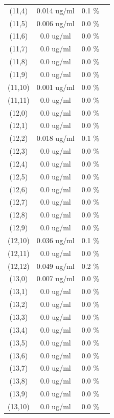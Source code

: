 \documentclass{article}
\begin{document}
\begin{tabular}{c c c c}
(11,4)&        0.014 ug/ml        &0.1 \%\\
(11,5)&        0.006 ug/ml        &0.0 \%\\
(11,6)&        0.0 ug/ml        &0.0 \%\\
(11,7)&        0.0 ug/ml        &0.0 \%\\
(11,8)&        0.0 ug/ml        &0.0 \%\\
(11,9)&        0.0 ug/ml        &0.0 \%\\
(11,10)&        0.001 ug/ml        &0.0 \%\\
(11,11)&        0.0 ug/ml        &0.0 \%\\
(12,0)&        0.0 ug/ml        &0.0 \%\\
(12,1)&        0.0 ug/ml        &0.0 \%\\
(12,2)&        0.018 ug/ml        &0.1 \%\\
(12,3)&        0.0 ug/ml        &0.0 \%\\
(12,4)&        0.0 ug/ml        &0.0 \%\\
(12,5)&        0.0 ug/ml        &0.0 \%\\
(12,6)&        0.0 ug/ml        &0.0 \%\\
(12,7)&        0.0 ug/ml        &0.0 \%\\
(12,8)&        0.0 ug/ml        &0.0 \%\\
(12,9)&        0.0 ug/ml        &0.0 \%\\
(12,10)&        0.036 ug/ml        &0.1 \%\\
(12,11)&        0.0 ug/ml        &0.0 \%\\
(12,12)&        0.049 ug/ml        &0.2 \%\\
(13,0)&        0.007 ug/ml        &0.0 \%\\
(13,1)&        0.0 ug/ml        &0.0 \%\\
(13,2)&        0.0 ug/ml        &0.0 \%\\
(13,3)&        0.0 ug/ml        &0.0 \%\\
(13,4)&        0.0 ug/ml        &0.0 \%\\
(13,5)&        0.0 ug/ml        &0.0 \%\\
(13,6)&        0.0 ug/ml        &0.0 \%\\
(13,7)&        0.0 ug/ml        &0.0 \%\\
(13,8)&        0.0 ug/ml        &0.0 \%\\
(13,9)&        0.0 ug/ml        &0.0 \%\\
(13,10)&        0.0 ug/ml        &0.0 \%\\

\end{tabular}
\end{document}
